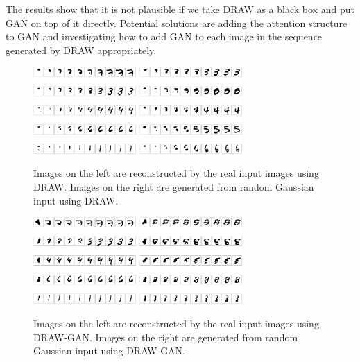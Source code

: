 \documentclass[10pt]{article}
\begin{document}
The results show that it is not plausible if we take DRAW as a black box and put GAN on top of it directly. Potential solutions are adding the attention structure to GAN and investigating how to add GAN to each image in the sequence generated by DRAW appropriately.  
\begin{figure}[!ht]
\centering
\includegraphics[width=0.35\textwidth]{images/draw_inference.png}
\includegraphics[width=0.35\textwidth]{images/draw_generate.png}
\caption{Images on the left are reconstructed by the real input images using DRAW. Images on the right are generated from random Gaussian input using DRAW. }
\label{figure:draw}
\end{figure}

\begin{figure}[!ht]
\centering
\includegraphics[width=0.35\textwidth]{images/drwa_gan_inference.png}
\includegraphics[width=0.35\textwidth]{images/draw_gan.png}
\caption{Images on the left are reconstructed by the real input images using DRAW-GAN. Images on the right are generated from random Gaussian input using DRAW-GAN. }
\label{figure:draw_gan}

\end{figure}
\end{document}
